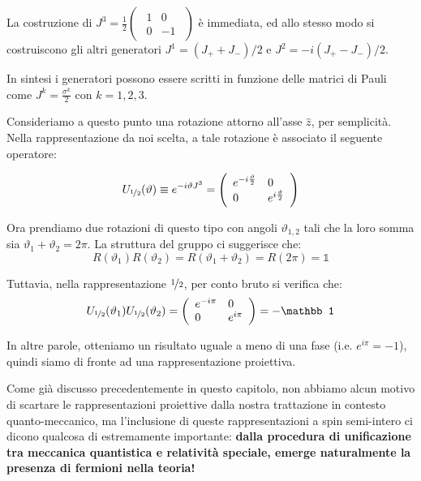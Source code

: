 \documentclass[../main.tex]{subfiles}
\begin{document}
\begin{enumerate}
\begin{example}
        La costruzione di \(J^3 = \frac{1}{2}\begin{pmatrix}\begin{array}{ll} 1 & 0 \\ 0 & -1 \end{array} \end{pmatrix}\) è immediata, ed allo stesso modo si costruiscono gli altri generatori \(J^1= (J_+ + J_-)/2\) e \(J^2= -i(J_+ - J_-)/2\). 

        In sintesi i generatori possono essere scritti in funzione delle matrici di Pauli come \(J^k = \frac{\sigma^k}{2}\) con $k=1,2,3$.

        Consideriamo a questo punto una rotazione attorno all'asse $\hat{z}$, per semplicità. Nella rappresentazione da noi scelta, a tale rotazione è associato il seguente operatore:

        \[
        U_{\nicefrac{1}{2}}(\vartheta) \equiv e^{-i\vartheta J^3} = \begin{pmatrix}\begin{array}{ll} e^{-i\frac{\vartheta}{2}} & 0 \\ 0 & e^{i\frac{\vartheta}{2}} \end{array} \end{pmatrix}
        \]

        Ora prendiamo due rotazioni di questo tipo con angoli \(\vartheta_{1,2}\) tali che la loro somma sia \(\vartheta_1 + \vartheta_2 = 2\pi\). La struttura del gruppo ci suggerisce che:
        \[
        R(\vartheta_1)R(\vartheta_2) = R(\vartheta_1+\vartheta_2) = R(2\pi) = \mathbb 1
        \]

        Tuttavia, nella rappresentazione $\nicefrac{1}{2}$, per conto bruto si verifica che:
        \[
        U_{\nicefrac{1}{2}}(\vartheta_1)U_{\nicefrac{1}{2}}(\vartheta_2) = \begin{pmatrix}\begin{array}{ll} e^{-i\pi} & 0 \\ 0 & e^{i\pi} \end{array} \end{pmatrix} = -\mathbb 1
        \]

        In altre parole, otteniamo un risultato uguale a meno di una fase (i.e. $e^{i\pi} = -1$), quindi siamo di fronte ad una rappresentazione proiettiva.
        \label{example:so3_1/2proj_repres}
    \end{example}
    Come già discusso precedentemente in questo capitolo, non abbiamo alcun motivo di scartare le rappresentazioni proiettive dalla nostra trattazione in contesto quanto-meccanico, ma l'inclusione di queste rappresentazioni a spin semi-intero ci dicono qualcosa di estremamente importante: \textbf{dalla procedura di unificazione tra meccanica quantistica e relatività speciale, emerge naturalmente la presenza di fermioni nella teoria!} 
    

\end{enumerate}
\end{document}
